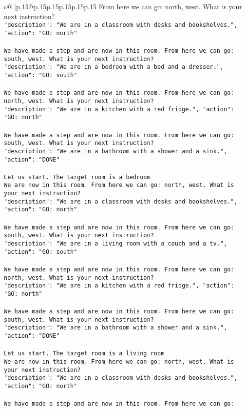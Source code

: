 \documentclass{article}
\begin{document}
{\begin{supertabular}{c@{$\;$}|p{.15\linewidth}@{}p{.15\linewidth}p{.15\linewidth}p{.15\linewidth}p{.15\linewidth}p{.15\linewidth}}
{{{From here we can go: north, west. What is your next instruction?\\ \tt {"description": "We are in a classroom with desks and bookshelves.", "action": "GO: north"}\\ \tt \\ \tt We have made a step and are now in this room. From here we can go: south, west. What is your next instruction?\\ \tt {"description": "We are in a bedroom with a bed and a dresser.", "action": "GO: south"}\\ \tt \\ \tt We have made a step and are now in this room. From here we can go: north, west. What is your next instruction?\\ \tt {"description": "We are in a kitchen with a red fridge.", "action": "GO: north"}\\ \tt \\ \tt We have made a step and are now in this room. From here we can go: south, west. What is your next instruction?\\ \tt {"description": "We are in a bathroom with a shower and a sink.", "action": "DONE"}\\ \tt \\ \tt Let us start. The target room is a bedroom\\ \tt We are now in this room. From here we can go: north, west. What is your next instruction?\\ \tt {"description": "We are in a classroom with desks and bookshelves.", "action": "GO: north"}\\ \tt \\ \tt We have made a step and are now in this room. From here we can go: south, west. What is your next instruction?\\ \tt {"description": "We are in a living room with a couch and a tv.", "action": "GO: south"}\\ \tt \\ \tt We have made a step and are now in this room. From here we can go: north, west. What is your next instruction?\\ \tt {"description": "We are in a kitchen with a red fridge.", "action": "GO: north"}\\ \tt \\ \tt We have made a step and are now in this room. From here we can go: south, west. What is your next instruction?\\ \tt {"description": "We are in a bathroom with a shower and a sink.", "action": "DONE"}\\ \tt \\ \tt Let us start. The target room is a living room\\ \tt We are now in this room. From here we can go: north, west. What is your next instruction?\\ \tt {"description": "We are in a classroom with desks and bookshelves.", "action": "GO: north"}\\ \tt \\ \tt We have made a step and are now in this room. From here we can go: }}}
\end{supertabular}}
\end{document}

